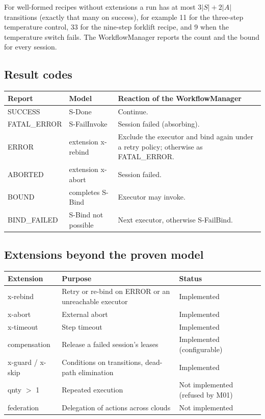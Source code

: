 \documentclass[a4paper]{arrowhead}
\begin{document}
For well-formed recipes without extensions a run has at most $3|S| + 2|A|$ transitions (exactly that many on success),
for example 11 for the three-step temperature control, 33 for the nine-step forklift recipe, and 9 when the
temperature switch fails. The WorkflowManager reports the count and the bound for every session.

\subsection{Result codes}

{\small
\begin{longtable}{|p{2.8cm}|p{3.6cm}|p{9.4cm}|}

\hline
\rowcolor{gray!33} Report & Model & Reaction of the WorkflowManager \\ \hline
\endhead
SUCCESS & S-Done & Continue. \\ \hline
FATAL\_ERROR & S-FailInvoke & Session failed (absorbing). \\ \hline
ERROR & extension x-rebind & Exclude the executor and bind again under a retry policy; otherwise as FATAL\_ERROR. \\ \hline
ABORTED & extension x-abort & Session failed. \\ \hline
BOUND & completes S-Bind & Executor may invoke. \\ \hline
BIND\_FAILED & S-Bind not possible & Next executor, otherwise S-FailBind. \\ \hline
\end{longtable}
}


\subsection{Extensions beyond the proven model}

{\small
\begin{longtable}{|p{3.0cm}|p{8.2cm}|p{4.6cm}|}

\hline
\rowcolor{gray!33} Extension & Purpose & Status \\ \hline
\endhead
x-rebind & Retry or re-bind on ERROR or an unreachable executor & Implemented \\ \hline
x-abort & External abort & Implemented \\ \hline
x-timeout & Step timeout & Implemented \\ \hline
compensation & Release a failed session's leases & Implemented (configurable) \\ \hline
x-guard / x-skip & Conditions on transitions, dead-path elimination & Implemented \\ \hline
qnty $>$ 1 & Repeated execution & Not implemented (refused by M01) \\ \hline
federation & Delegation of actions across clouds & Not implemented \\ \hline
\end{longtable}
}
\end{document}

